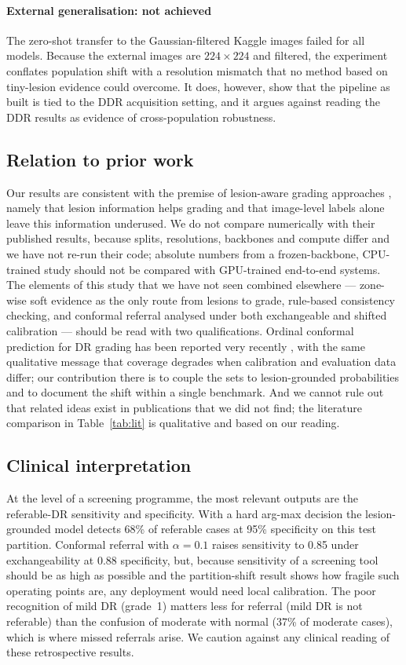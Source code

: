 \paragraph{External generalisation: not achieved} The zero-shot transfer to the Gaussian-filtered Kaggle images failed for all models. Because the external images are $224\times224$ and filtered, the experiment conflates population shift with a resolution mismatch that no method based on tiny-lesion evidence could overcome. It does, however, show that the pipeline as built is tied to the DDR acquisition setting, and it argues against reading the DDR results as evidence of cross-population robustness.

\subsection{Relation to prior work}
Our results are consistent with the premise of lesion-aware grading approaches \citep{wang2017zoomin,yang2017twostage,sun2021lat,huang2021lesioncl}, namely that lesion information helps grading and that image-level labels alone leave this information underused. We do not compare numerically with their published results, because splits, resolutions, backbones and compute differ and we have not re-run their code; absolute numbers from a frozen-backbone, CPU-trained study should not be compared with GPU-trained end-to-end systems. The elements of this study that we have not seen combined elsewhere --- zone-wise soft evidence as the only route from lesions to grade, rule-based consistency checking, and conformal referral analysed under both exchangeable and shifted calibration --- should be read with two qualifications. Ordinal conformal prediction for DR grading has been reported very recently \citep{hasan2026ordinalcp}, with the same qualitative message that coverage degrades when calibration and evaluation data differ; our contribution there is to couple the sets to lesion-grounded probabilities and to document the shift within a single benchmark. And we cannot rule out that related ideas exist in publications that we did not find; the literature comparison in Table~\ref{tab:lit} is qualitative and based on our reading.

\subsection{Clinical interpretation}
At the level of a screening programme, the most relevant outputs are the referable-DR sensitivity and specificity. With a hard arg-max decision the lesion-grounded model detects 68\% of referable cases at 95\% specificity on this test partition. Conformal referral with $\alpha=0.1$ raises sensitivity to 0.85 under exchangeability at 0.88 specificity, but, because sensitivity of a screening tool should be as high as possible and the partition-shift result shows how fragile such operating points are, any deployment would need local calibration. The poor recognition of mild DR (grade~1) matters less for referral (mild DR is not referable) than the confusion of moderate with normal (37\% of moderate cases), which is where missed referrals arise. We caution against any clinical reading of these retrospective results.

